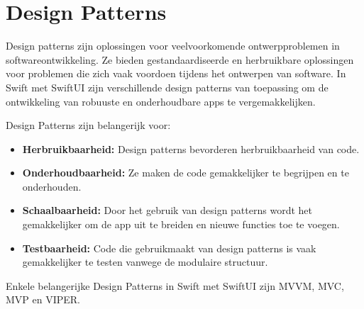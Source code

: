 \section{Design Patterns}
Design patterns zijn oplossingen voor veelvoorkomende ontwerpproblemen in softwareontwikkeling. Ze bieden gestandaardiseerde en herbruikbare oplossingen voor problemen die zich vaak voordoen tijdens het ontwerpen van software. In Swift met SwiftUI zijn verschillende design patterns van toepassing om de ontwikkeling van robuuste en onderhoudbare apps te vergemakkelijken.

Design Patterns zijn belangerijk voor:
\begin{itemize}
    \item {\textbf{Herbruikbaarheid:} Design patterns bevorderen herbruikbaarheid van code.}
    \item {\textbf{Onderhoudbaarheid:} Ze maken de code gemakkelijker te begrijpen en te onderhouden.}
    \item {\textbf{Schaalbaarheid:} Door het gebruik van design patterns wordt het gemakkelijker om de app uit te breiden en nieuwe functies toe te voegen.}
    \item {\textbf{Testbaarheid:} Code die gebruikmaakt van design patterns is vaak gemakkelijker te testen vanwege de modulaire structuur.}
\end{itemize}
\autocite{MediumPatterns} Enkele belangerijke Design Patterns in Swift met SwiftUI zijn MVVM, MVC, MVP en VIPER.

